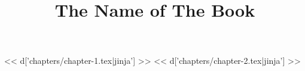 \documentclass[11pt,a4paper]{book}
\title{The Name of The Book}
\begin{document}
\frontmatter

\maketitle

\tableofcontents

\mainmatter

<< d['chapters/chapter-1.tex|jinja'] >>
<< d['chapters/chapter-2.tex|jinja'] >>
\end{document}
